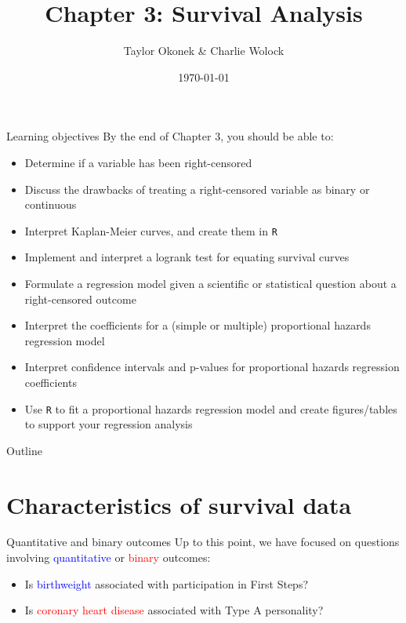 \documentclass[10pt,t]{beamer}
\title{Chapter 3: Survival Analysis}
\author{Taylor Okonek \& Charlie Wolock}
\date{\today}
\begin{document}
\begin{frame}
	\titlepage 
\end{frame}

\begin{frame}{Learning objectives}
	By the end of Chapter 3, you should be able to:
	
	\begin{itemize}
		\item Determine if a variable has been right-censored
		\item Discuss the drawbacks of treating a right-censored variable as binary or continuous
		\item Interpret Kaplan-Meier curves, and create them in \texttt{R}
		\item Implement and interpret a logrank test for equating survival curves
		\item Formulate a regression model given a scientific or statistical question about a right-censored outcome
		\item Interpret the coefficients for a (simple or multiple) proportional hazards regression model
		\item Interpret confidence intervals and p-values for proportional hazards regression coefficients
		\item Use \texttt{R} to fit a proportional hazards regression model and create figures/tables to support your regression analysis
	\end{itemize}
	
\end{frame}

\begin{frame}{Outline}
	\tableofcontents
\end{frame}



\section{Characteristics of survival data}

\begin{frame}{Quantitative and binary outcomes}
Up to this point, we have focused on questions involving \textcolor{blue}{quantitative} or \textcolor{red}{binary} outcomes: 
\begin{itemize}
\item Is \textcolor{blue}{birthweight} associated with participation in First Steps?
\item Is \textcolor{red}{coronary heart disease} associated with Type A personality? 
\end{itemize}
\end{frame}
\end{document}
